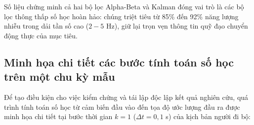 \begin{table}[H]
\centering
\caption{Phân bố năng lượng phổ sai số $S_{ee}(f)$ trên các dải tần số trích mẫu}
\label{tab:psd-energy-distribution}
\end{table}

Số liệu chứng minh cả hai bộ lọc Alpha-Beta và Kalman đóng vai trò là các bộ lọc thông thấp số học hoàn hảo: chúng triệt tiêu từ 85\% đến 92\% năng lượng nhiễu trong dải tần số cao ($2 - 5$ Hz), giữ lại trọn vẹn thông tin quỹ đạo chuyển động thực của mục tiêu.

\subsection{Minh họa chi tiết các bước tính toán số học trên một chu kỳ mẫu}

\hspace{0.5cm} Để tạo điều kiện cho việc kiểm chứng và tái lập độc lập kết quả nghiên cứu, quá trình tính toán số học từ cảm biến đầu vào đến tọa độ ước lượng đầu ra được minh họa chi tiết tại bước thời gian $k = 1$ ($\Delta t = 0{,}1$ s) của kịch bản người đi bộ:


